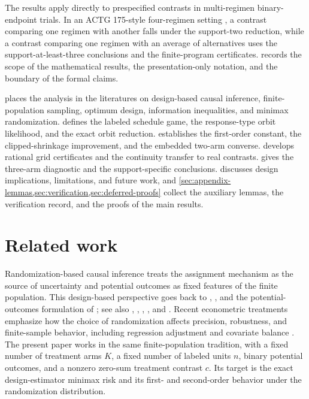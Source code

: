 \documentclass[11pt]{article}
\begin{document}
The results apply directly to prespecified contrasts in multi-regimen binary-endpoint trials. In an ACTG 175-style four-regimen setting \citep{hammer_et_al_1996_actg175}, a contrast comparing one regimen with another falls under the support-two reduction, while a contrast comparing one regimen with an average of alternatives uses the support-at-least-three conclusions and the finite-program certificates.  records the scope of the mathematical results, the presentation-only notation, and the boundary of the formal claims.

 places the analysis in the literatures on design-based causal inference, finite-population sampling, optimum design, information inequalities, and minimax randomization.  defines the labeled schedule game, the response-type orbit likelihood, and the exact orbit reduction.  establishes the first-order constant, the clipped-shrinkage improvement, and the embedded two-arm converse.  develops rational grid certificates and the continuity transfer to real contrasts.  gives the three-arm diagnostic and the support-specific conclusions.  discusses design implications, limitations, and future work, and \cref{sec:appendix-lemmas,sec:verification,sec:deferred-proofs} collect the auxiliary lemmas, the verification record, and the proofs of the main results.


\section{Related work}\label{sec:related}

Randomization-based causal inference treats the assignment mechanism as the source of uncertainty and potential outcomes as fixed features of the finite population. This design-based perspective goes back to \citet{fisher_1935}, \citet{neyman_1990}, and the potential-outcomes formulation of \citet{rubin_1974,rubin_1978}; see also \citet{holland_1986}, \citet{imbens_rubin_2015}, \citet{imbens_wooldridge_2009}, \citet{athey_imbens_2017}, and \citet{ding_2024}. Recent econometric treatments emphasize how the choice of randomization affects precision, robustness, and finite-sample behavior, including regression adjustment and covariate balance \citep{freedman_2008,lin_2013,dasgupta_2015,morgan_2012,li_2018,bai_2024}. The present paper works in the same finite-population tradition, with a fixed number of treatment arms \(K\), a fixed number of labeled units \(n\), binary potential outcomes, and a nonzero zero-sum treatment contrast \(c\). Its target is the exact design-estimator minimax risk and its first- and second-order behavior under the randomization distribution.
\end{document}
